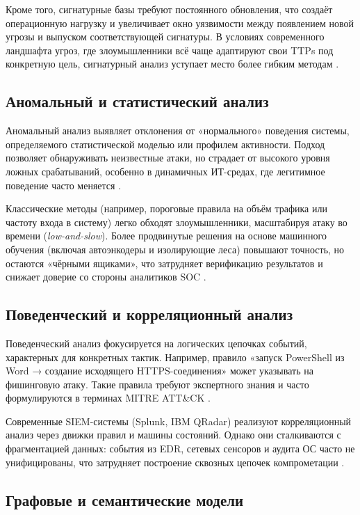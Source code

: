 Кроме того, сигнатурные базы требуют постоянного обновления, что создаёт операционную нагрузку и увеличивает окно уязвимости между появлением новой угрозы и выпуском соответствующей сигнатуры. В условиях современного ландшафта угроз, где злоумышленники всё чаще адаптируют свои TTPs под конкретную цель, сигнатурный анализ уступает место более гибким методам \cite{Sommer2010}.

\subsection{Аномальный и статистический анализ}

Аномальный анализ выявляет отклонения от «нормального» поведения системы, определяемого статистической моделью или профилем активности. Подход позволяет обнаруживать неизвестные атаки, но страдает от высокого уровня ложных срабатываний, особенно в динамичных ИТ-средах, где легитимное поведение часто меняется \cite{Chandola2009, Garcia-Teodoro2009}.

Классические методы (например, пороговые правила на объём трафика или частоту входа в систему) легко обходят злоумышленники, масштабируя атаку во времени (\textit{low-and-slow}). Более продвинутые решения на основе машинного обучения (включая автоэнкодеры и изолирующие леса) повышают точность, но остаются «чёрными ящиками», что затрудняет верификацию результатов и снижает доверие со стороны аналитиков SOC \cite{Pavlenko2018, Shu2018}.

\subsection{Поведенческий и корреляционный анализ}

Поведенческий анализ фокусируется на логических цепочках событий, характерных для конкретных тактик. Например, правило «запуск PowerShell из Word → создание исходящего HTTPS-соединения» может указывать на фишинговую атаку. Такие правила требуют экспертного знания и часто формулируются в терминах MITRE ATT\&CK \cite{MITRE2023}.

Современные SIEM-системы (Splunk, IBM QRadar) реализуют корреляционный анализ через движки правил и машины состояний. Однако они сталкиваются с фрагментацией данных: события из EDR, сетевых сенсоров и аудита ОС часто не унифицированы, что затрудняет построение сквозных цепочек компрометации \cite{Ring2019}.

\subsection{Графовые и семантические модели}

